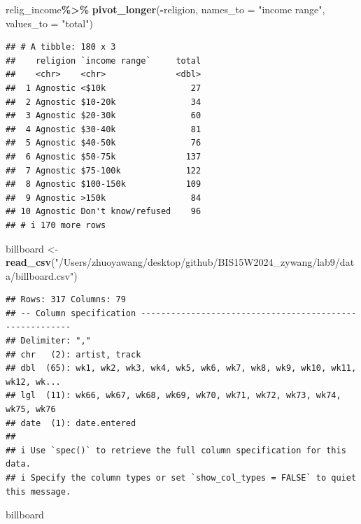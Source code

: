 \documentclass[
]{article}
\newenvironment{Shaded}{\begin{snugshade}}{\end{snugshade}}
\newcommand{\AttributeTok}[1]{\textcolor[rgb]{0.13,0.29,0.53}{#1}}
\newcommand{\FunctionTok}[1]{\textcolor[rgb]{0.13,0.29,0.53}{\textbf{#1}}}
\newcommand{\NormalTok}[1]{#1}
\newcommand{\OtherTok}[1]{\textcolor[rgb]{0.56,0.35,0.01}{#1}}
\newcommand{\SpecialCharTok}[1]{\textcolor[rgb]{0.81,0.36,0.00}{\textbf{#1}}}
\newcommand{\StringTok}[1]{\textcolor[rgb]{0.31,0.60,0.02}{#1}}
\begin{document}
\begin{Shaded}
\begin{Highlighting}[]
\NormalTok{relig\_income}\SpecialCharTok{\%\textgreater{}\%}
  \FunctionTok{pivot\_longer}\NormalTok{(}\SpecialCharTok{{-}}\NormalTok{religion, }
               \AttributeTok{names\_to =} \StringTok{"income range"}\NormalTok{,}
               \AttributeTok{values\_to =} \StringTok{"total"}\NormalTok{)}
\end{Highlighting}
\end{Shaded}

\begin{verbatim}
## # A tibble: 180 x 3
##    religion `income range`     total
##    <chr>    <chr>              <dbl>
##  1 Agnostic <$10k                 27
##  2 Agnostic $10-20k               34
##  3 Agnostic $20-30k               60
##  4 Agnostic $30-40k               81
##  5 Agnostic $40-50k               76
##  6 Agnostic $50-75k              137
##  7 Agnostic $75-100k             122
##  8 Agnostic $100-150k            109
##  9 Agnostic >150k                 84
## 10 Agnostic Don't know/refused    96
## # i 170 more rows
\end{verbatim}

\begin{Shaded}
\begin{Highlighting}[]
\NormalTok{billboard }\OtherTok{\textless{}{-}} \FunctionTok{read\_csv}\NormalTok{(}\StringTok{"/Users/zhuoyawang/desktop/github/BIS15W2024\_zywang/lab9/data/billboard.csv"}\NormalTok{)}
\end{Highlighting}
\end{Shaded}

\begin{verbatim}
## Rows: 317 Columns: 79
## -- Column specification --------------------------------------------------------
## Delimiter: ","
## chr   (2): artist, track
## dbl  (65): wk1, wk2, wk3, wk4, wk5, wk6, wk7, wk8, wk9, wk10, wk11, wk12, wk...
## lgl  (11): wk66, wk67, wk68, wk69, wk70, wk71, wk72, wk73, wk74, wk75, wk76
## date  (1): date.entered
## 
## i Use `spec()` to retrieve the full column specification for this data.
## i Specify the column types or set `show_col_types = FALSE` to quiet this message.
\end{verbatim}

\begin{Shaded}
\begin{Highlighting}[]
\NormalTok{billboard}
\end{Highlighting}
\end{Shaded}
\end{document}
